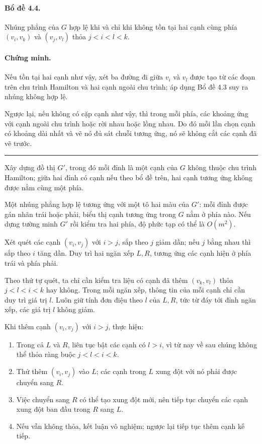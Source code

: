 \documentclass[11pt]{article}
\begin{document}
\paragraph{Bổ đề 4.4.}
Nhúng phẳng của $G$ hợp lệ khi và chỉ khi không tồn tại hai cạnh cùng phía
$(v_i,v_k)$ và $(v_j,v_l)$ thỏa $j<i<l<k$.

\paragraph{Chứng minh.}
Nếu tồn tại hai cạnh như vậy, xét ba đường đi giữa $v_i$ và $v_l$ được tạo từ
các đoạn trên chu trình Hamilton và hai cạnh ngoài chu trình; áp dụng Bổ đề 4.3
suy ra nhúng không hợp lệ.

Ngược lại, nếu không có cặp cạnh như vậy, thì trong mỗi phía, các khoảng ứng
với cạnh ngoài chu trình hoặc rời nhau hoặc lồng nhau. Do đó mỗi lần chọn cạnh
có khoảng dài nhất và vẽ nó đủ sát chuỗi tương ứng, nó sẽ không cắt các cạnh đã
vẽ trước.
\hfill\rule{0.55em}{0.55em}

Xây dựng đồ thị $G'$, trong đó mỗi đỉnh là một cạnh của $G$ không thuộc chu
trình Hamilton; giữa hai đỉnh có cạnh nếu theo bổ đề trên, hai cạnh tương ứng
không được nằm cùng một phía.

Một nhúng phẳng hợp lệ tương ứng với một tô hai màu của $G'$: mỗi đỉnh được gán
nhãn trái hoặc phải, biểu thị cạnh tương ứng trong $G$ nằm ở phía nào. Nếu dựng
tường minh $G'$ rồi kiểm tra hai phía, độ phức tạp có thể là $O(m^2)$.

Xét quét các cạnh $(v_i,v_j)$ với $i>j$, sắp theo $j$ giảm dần; nếu $j$ bằng
nhau thì sắp theo $i$ tăng dần. Duy trì hai ngăn xếp $L,R$, tương ứng các cạnh
hiện ở phía trái và phía phải.

Theo thứ tự quét, ta chỉ cần kiểm tra liệu có cạnh đã thêm $(v_k,v_l)$ thỏa
$j<l<i<k$ hay không. Trong mỗi ngăn xếp, thông tin của mỗi cạnh chỉ cần duy trì
giá trị $l$. Luôn giữ tính đơn điệu theo $l$ của $L,R$, tức từ đáy tới đỉnh
ngăn xếp, các giá trị $l$ không giảm.

Khi thêm cạnh $(v_i,v_j)$ với $i>j$, thực hiện:
\begin{enumerate}
  \item Trong cả $L$ và $R$, liên tục bật các cạnh có $l>i$, vì từ nay về sau
  chúng không thể thỏa ràng buộc $j<l<i<k$.
  \item Thử thêm $(v_i,v_j)$ vào $L$; các cạnh trong $L$ xung đột với nó phải
  được chuyển sang $R$.
  \item Việc chuyển sang $R$ có thể tạo xung đột mới, nên tiếp tục chuyển các
  cạnh xung đột ban đầu trong $R$ sang $L$.
  \item Nếu vẫn không thỏa, kết luận vô nghiệm; ngược lại tiếp tục thêm cạnh
  kế tiếp.
\end{enumerate}
\end{document}
